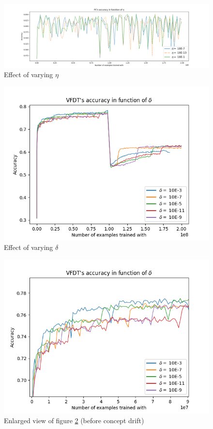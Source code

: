 \documentclass[12pt]{article}
\begin{document}
\begin{figure}
	
	\centering
	\includegraphics[width=1.6\linewidth, center]{./img/pc_etas.png}
	\caption{Effect of varying $\eta$}
	\label{fig:pc_etas}	
\end{figure}
\begin{figure}
	\centering
	\includegraphics[width=.8\linewidth]{./img/vfdt_delta.png}
	\caption{Effect of varying $\delta$}
	\label{fig:vfdt_deltas}	
\end{figure}
\begin{figure}
	\centering
	\includegraphics[width=.8\linewidth]{./img/vfdt_delta_zoom2.png}
	\caption{Enlarged view of figure \ref{fig:vfdt_deltas} (before concept drift)}
	\label{fig:vfdt_delta_zoom}	
\end{figure}
\end{document}
